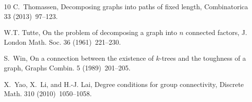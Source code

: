 \documentclass[10pt,bezier]{article}
\begin{document}
\begin{thebibliography}{10}
 C.~Thomassen, Decomposing graphs into paths of fixed length, Combinatorica 33 (2013)~97--123.

W.T. Tutte, On the problem of decomposing a graph into {$n$} connected factors, J. London Math. Soc. 36 (1961)~221--230.

 S.~Win, On a connection between the existence of {$k$}-trees and the toughness of a graph, Graphs Combin. 5 (1989)~201--205.

 X.~Yao, X.~Li, and H.-J. Lai, Degree conditions for group connectivity, Discrete Math. 310 (2010)~1050--1058.

\end{thebibliography}
%
%
\end{document}
